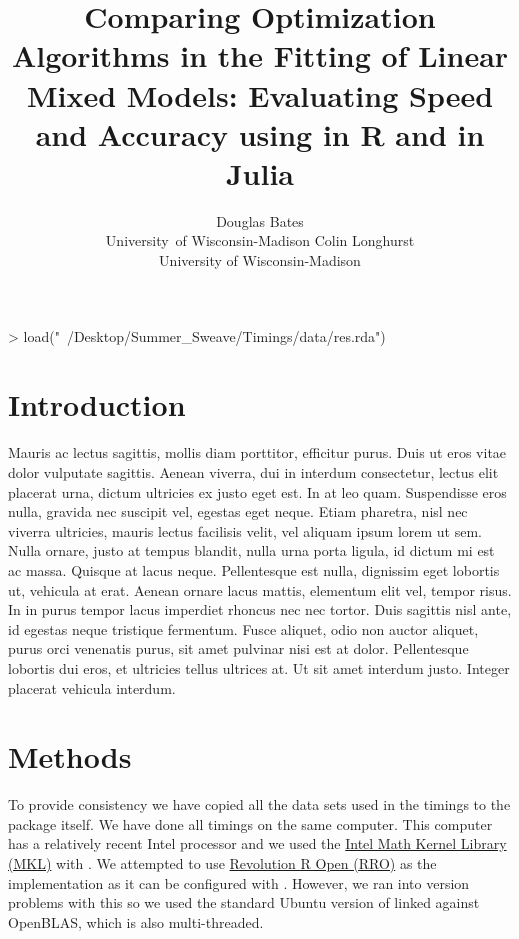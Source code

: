 \documentclass[article]{jss}
\author{Douglas Bates\\University\ of Wisconsin-Madison \And 
        Colin Longhurst \\University of Wisconsin-Madison}
\title{Comparing Optimization Algorithms in the Fitting of Linear Mixed Models: Evaluating Speed and Accuracy using \pkg{lme4} in R and \pkg{lmm} in Julia}
\begin{document}
\begin{Schunk}
\begin{Sinput}
> load("~/Desktop/Summer_Sweave/Timings/data/res.rda")
\end{Sinput}
\end{Schunk}


\section[Introduction]{Introduction}



Mauris ac lectus sagittis, mollis diam porttitor, efficitur purus. Duis ut eros vitae dolor vulputate sagittis. Aenean viverra, dui in interdum consectetur, lectus elit placerat urna, dictum ultricies ex justo eget est. In at leo quam. Suspendisse eros nulla, gravida nec suscipit vel, egestas eget neque. Etiam pharetra, nisl nec viverra ultricies, mauris lectus facilisis velit, vel aliquam ipsum lorem ut sem. Nulla ornare, justo at tempus blandit, nulla urna porta ligula, id dictum mi est ac massa. Quisque at lacus neque. Pellentesque est nulla, dignissim eget lobortis ut, vehicula at erat. Aenean ornare lacus mattis, elementum elit vel, tempor risus. In in purus tempor lacus imperdiet rhoncus nec nec tortor. Duis sagittis nisl ante, id egestas neque tristique fermentum. Fusce aliquet, odio non auctor aliquet, purus orci venenatis purus, sit amet pulvinar nisi est at dolor. Pellentesque lobortis dui eros, et ultricies tellus ultrices at. Ut sit amet interdum justo. Integer placerat vehicula interdum. 


\section[Methods]{Methods}


To provide consistency we have copied all the data sets used in the
timings to the  package itself. We have done all timings
on the same computer. This computer has a relatively recent Intel
processor and we used the
\href{https://software.intel.com/en-us/intel-mkl}{Intel Math Kernel
Library (MKL)} with . We attempted to use
\href{www.revolutionanalytics.com/revolution-r-open}{Revolution R Open
(RRO)} as the  implementation as it can be configured with .
However, we ran into version problems with this so we used the standard
Ubuntu version of  linked against OpenBLAS, which is also
multi-threaded.
\end{document}
